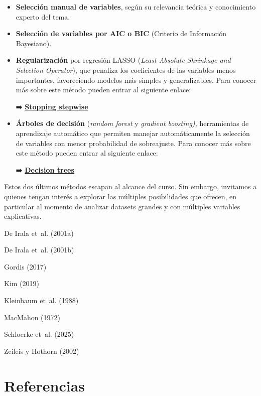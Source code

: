 \documentclass[
  spanish,
  a4paper,
]{scrbook}
\begin{document}
\begin{itemize}
\item
  \textbf{Selección manual de variables}, según su relevancia teórica y
  conocimiento experto del tema.
\item
  \textbf{Selección de variables por AIC o BIC} (Criterio de Información
  Bayesiano).
\item
  \textbf{Regularización} por regresión LASSO (\emph{Least Absolute
  Shrinkage and Selection Operator}), que penaliza los coeficientes de
  las variables menos importantes, favoreciendo modelos más simples y
  generalizables. Para conocer más sobre este método pueden entrar al
  siguiente enlace:

  ➡️
  \href{https://www.lexjansen.com/pnwsug/2008/DavidCassell-StoppingStepwise.pdf}{\textbf{Stopping
  stepwise}}
\item
  \textbf{Árboles de decisión} (\emph{random forest} y \emph{gradient
  boosting),} herramientas de aprendizaje automático que permiten
  manejar automáticamente la selección de variables con menor
  probabilidad de sobreajuste. Para conocer más sobre este método pueden
  entrar al siguiente enlace:

  ➡️
  \href{https://www.ibm.com/es-es/think/topics/decision-trees}{\textbf{Decision
  trees}}
\end{itemize}

Estos dos últimos métodos escapan al alcance del curso. Sin embargo,
invitamos a quienes tengan interés a explorar las múltiples
posibilidades que ofrecen, en particular al momento de analizar datasets
grandes y con múltiples variables explicativas.

De Irala et~al. (2001a)

De Irala et~al. (2001b)

Gordis (2017)

Kim (2019)

Kleinbaum et~al. (1988)

MacMahon (1972)

Schloerke et~al. (2025)

Zeileis y Hothorn (2002)

\section*{Referencias}\label{referencias-17}

\end{document}
